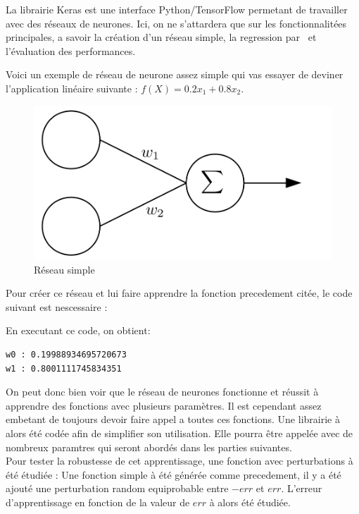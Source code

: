 La librairie Keras est une interface Python/TensorFlow\cite{tf} permetant de travailler avec des réseaux de neurones.
Ici, on ne s'attardera que sur les fonctionnalitées principales,
a savoir la création d'un réseau simple,
la regression par \sgd\ et l'évaluation des performances.


Voici un exemple de réseau de neurone assez simple
qui vas essayer de deviner l'application linéaire suivante : $f(X) = 0.2x_1 + 0.8x_2$.

\begin{figure}[H]
    \center
    \includegraphics[height=\petit]{pict/net2.png}
	\caption{Réseau simple}
	\label{fig:net2}
\end{figure}
\vspace{-12pt}


Pour créer ce réseau et lui faire apprendre la fonction precedement citée,
le code suivant est nescessaire :



En executant ce code, on obtient:
\begin{lstlisting}
w0 : 0.19988934695720673
w1 : 0.8001111745834351
\end{lstlisting}
On peut donc bien voir que le réseau de neurones fonctionne et
réussit à apprendre des fonctions avec plusieurs paramètres.
Il est cependant assez embetant de toujours devoir faire appel a toutes ces fonctions.
Une librairie à alors été codée afin de simplifier son utilisation.
Elle pourra être appelée avec de nombreux paramtres qui seront abordés dans les parties suivantes.\\


Pour tester la robustesse de cet apprentissage, une fonction avec perturbations à été étudiée :
Une fonction simple à été générée comme precedement, il y a été ajouté une perturbation random equiprobable
entre $ - err$ et $err$.
L’erreur d’apprentissage en fonction de la valeur de $err$ à alors été étudiée.\\


